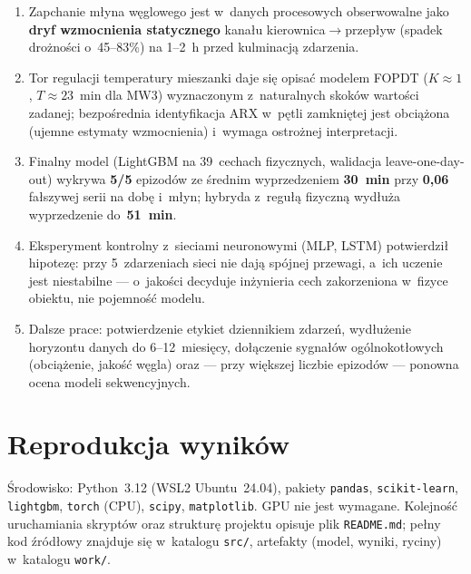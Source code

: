 \documentclass[11pt,a4paper]{article}
\begin{document}
\begin{enumerate}
  \item Zapchanie młyna węglowego jest w~danych procesowych obserwowalne jako
        \textbf{dryf wzmocnienia statycznego} kanału kierownica$\to$przepływ
        (spadek drożności o~45--83\%) na 1--2~h przed kulminacją zdarzenia.
  \item Tor regulacji temperatury mieszanki daje się opisać modelem FOPDT
        ($K\!\approx\!1$, $T\!\approx\!23$~min dla MW3) wyznaczonym
        z~naturalnych skoków wartości zadanej; bezpośrednia identyfikacja
        ARX w~pętli zamkniętej jest obciążona (ujemne estymaty wzmocnienia)
        i~wymaga ostrożnej interpretacji.
  \item Finalny model (LightGBM na 39~cechach fizycznych, walidacja
        leave-one-day-out) wykrywa \textbf{5/5} epizodów ze średnim
        wyprzedzeniem \textbf{30~min} przy \textbf{0{,}06} fałszywej serii
        na dobę i~młyn; hybryda z~regułą fizyczną wydłuża wyprzedzenie
        do~\textbf{51~min}.
  \item Eksperyment kontrolny z~sieciami neuronowymi (MLP, LSTM) potwierdził
        hipotezę: przy 5~zdarzeniach sieci nie dają spójnej przewagi, a~ich
        uczenie jest niestabilne --- o~jakości decyduje inżynieria cech
        zakorzeniona w~fizyce obiektu, nie pojemność modelu.
  \item Dalsze prace: potwierdzenie etykiet dziennikiem zdarzeń, wydłużenie
        horyzontu danych do 6--12~miesięcy, dołączenie sygnałów
        ogólnokotłowych (obciążenie, jakość węgla) oraz --- przy większej
        liczbie epizodów --- ponowna ocena modeli sekwencyjnych.
\end{enumerate}

\appendix
\section{Reprodukcja wyników}

Środowisko: Python~3.12 (WSL2 Ubuntu~24.04), pakiety \texttt{pandas},
\texttt{scikit-learn}, \texttt{lightgbm}, \texttt{torch} (CPU),
\texttt{scipy}, \texttt{matplotlib}. GPU nie jest wymagane. Kolejność
uruchamiania skryptów oraz strukturę projektu opisuje plik \texttt{README.md};
pełny kod źródłowy znajduje się w~katalogu \texttt{src/}, artefakty
(model, wyniki, ryciny) w~katalogu \texttt{work/}.
\end{document}
